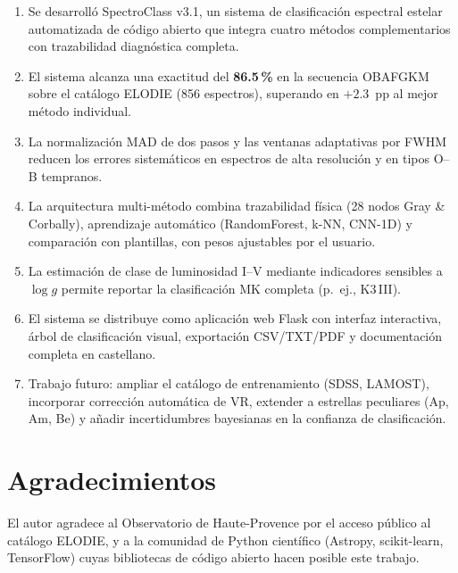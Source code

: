 \documentclass[12pt,a4paper]{article}
\begin{document}
\begin{enumerate}
  \item Se desarrolló SpectroClass v3.1, un sistema de clasificación espectral estelar
        automatizada de código abierto que integra cuatro métodos complementarios con
        trazabilidad diagnóstica completa.
  \item El sistema alcanza una exactitud del \textbf{86.5\,\%} en la secuencia
        OBAFGKM sobre el catálogo ELODIE (856 espectros), superando en $+2.3$~pp al
        mejor método individual.
  \item La normalización MAD de dos pasos y las ventanas adaptativas por FWHM reducen
        los errores sistemáticos en espectros de alta resolución y en tipos O--B
        tempranos.
  \item La arquitectura multi-método combina trazabilidad física (28 nodos Gray \&
        Corbally), aprendizaje automático (RandomForest, k-NN, CNN-1D) y comparación
        con plantillas, con pesos ajustables por el usuario.
  \item La estimación de clase de luminosidad I--V mediante indicadores sensibles a
        $\log g$ permite reportar la clasificación MK completa (p.~ej., K3\,III).
  \item El sistema se distribuye como aplicación web Flask con interfaz interactiva,
        árbol de clasificación visual, exportación CSV/TXT/PDF y documentación completa
        en castellano.
  \item Trabajo futuro: ampliar el catálogo de entrenamiento (SDSS, LAMOST), incorporar
        corrección automática de VR, extender a estrellas peculiares (Ap, Am, Be) y
        añadir incertidumbres bayesianas en la confianza de clasificación.
\end{enumerate}

\section*{Agradecimientos}

El autor agradece al Observatorio de Haute-Provence por el acceso público al catálogo
ELODIE, y a la comunidad de Python científico (Astropy, scikit-learn, TensorFlow) cuyas
bibliotecas de código abierto hacen posible este trabajo.
\end{document}
